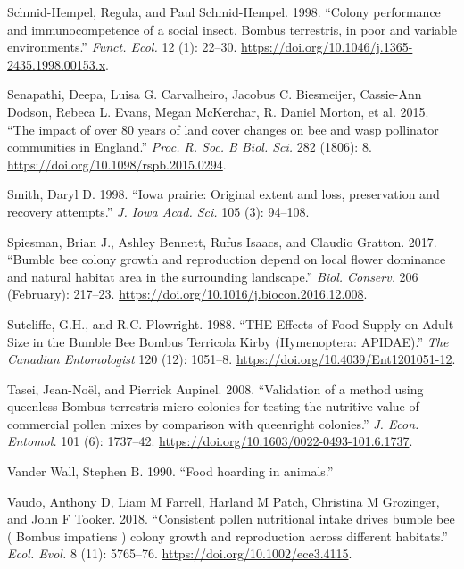 \documentclass[11pt,]{article}
\begin{document}
\leavevmode\hypertarget{ref-Schmid-Hempel1998a}{}%
Schmid-Hempel, Regula, and Paul Schmid-Hempel. 1998. ``Colony
performance and immunocompetence of a social insect, Bombus terrestris,
in poor and variable environments.'' \emph{Funct. Ecol.} 12 (1): 22--30.
\url{https://doi.org/10.1046/j.1365-2435.1998.00153.x}.

\leavevmode\hypertarget{ref-Senapathi2015a}{}%
Senapathi, Deepa, Luisa G. Carvalheiro, Jacobus C. Biesmeijer,
Cassie-Ann Dodson, Rebeca L. Evans, Megan McKerchar, R. Daniel Morton,
et al. 2015. ``The impact of over 80 years of land cover changes on bee
and wasp pollinator communities in England.'' \emph{Proc. R. Soc. B
Biol. Sci.} 282 (1806): 8. \url{https://doi.org/10.1098/rspb.2015.0294}.

\leavevmode\hypertarget{ref-Smith1998}{}%
Smith, Daryl D. 1998. ``Iowa prairie: Original extent and loss,
preservation and recovery attempts.'' \emph{J. Iowa Acad. Sci.} 105 (3):
94--108.

\leavevmode\hypertarget{ref-Spiesman2017}{}%
Spiesman, Brian J., Ashley Bennett, Rufus Isaacs, and Claudio Gratton.
2017. ``Bumble bee colony growth and reproduction depend on local flower
dominance and natural habitat area in the surrounding landscape.''
\emph{Biol. Conserv.} 206 (February): 217--23.
\url{https://doi.org/10.1016/j.biocon.2016.12.008}.

\leavevmode\hypertarget{ref-Sutcliffe1988}{}%
Sutcliffe, G.H., and R.C. Plowright. 1988. ``THE Effects of Food Supply
on Adult Size in the Bumble Bee Bombus Terricola Kirby (Hymenoptera:
APIDAE).'' \emph{The Canadian Entomologist} 120 (12): 1051--8.
\url{https://doi.org/10.4039/Ent1201051-12}.

\leavevmode\hypertarget{ref-Tasei2008}{}%
Tasei, Jean-Noël, and Pierrick Aupinel. 2008. ``Validation of a method
using queenless Bombus terrestris micro-colonies for testing the
nutritive value of commercial pollen mixes by comparison with queenright
colonies.'' \emph{J. Econ. Entomol.} 101 (6): 1737--42.
\url{https://doi.org/10.1603/0022-0493-101.6.1737}.

\leavevmode\hypertarget{ref-VanderWall1990}{}%
Vander Wall, Stephen B. 1990. ``Food hoarding in animals.''

\leavevmode\hypertarget{ref-Vaudo2018}{}%
Vaudo, Anthony D, Liam M Farrell, Harland M Patch, Christina M
Grozinger, and John F Tooker. 2018. ``Consistent pollen nutritional
intake drives bumble bee ( Bombus impatiens ) colony growth and
reproduction across different habitats.'' \emph{Ecol. Evol.} 8 (11):
5765--76. \url{https://doi.org/10.1002/ece3.4115}.
\end{document}
